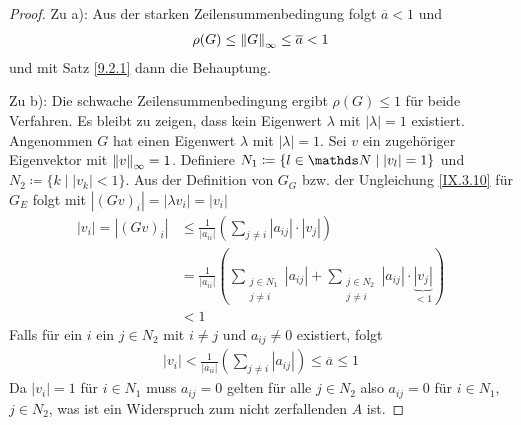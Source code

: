 \begin{Satze}[Zeilensummenkriterium]
\begin{proof}
    Zu a): Aus der starken Zeilensummenbedingung folgt $\overline{a}<1$
    und
    \begin{gather*}
      \rho(G)\leq \nn[G]_\infty \leq \overline{a}<1
    \end{gather*}
    und mit Satz \ref{9.2.1} dann die Behauptung.

    Zu b): Die schwache Zeilensummenbedingung ergibt 
    $\rho(G) \leq 1$ für beide Verfahren.
    Es bleibt zu zeigen, dass kein Eigenwert $\lambda$ mit
    $|\lambda|=1$ existiert.
    Angenommen $G$ hat einen Eigenwert $\lambda$ mit $|\lambda|=1$.
    Sei $v$ ein zugehöriger Eigenvektor mit $\nn[v]_\infty=1$.
    Definiere $N_1\coloneqq \{l\in\N \mid |v_l|=1\}$
    und $N_2\coloneqq \{k\mid |v_k| <1\}$.
    Aus der Definition von $G_G$ bzw. der Ungleichung \eqref{IX.3.10}
    für $G_E$ folgt mit $|(Gv)_i| = |\lambda v_i| = |v_i|$
    \begin{align*}
      |v_i| = |(Gv)_i| &\leq \frac{1}{|a_{ii}|}\left(
                         \sum_{j\neq i} |a_{ij}|\cdot |{v_j}|
                         \right) \\
                       &=\frac{1}{|a_{ii}|}\left(
                         \sum_{\substack{j\in N_1\\j\neq i}}|a_{ij}|
      +\sum_{\substack{j\in N_2\\j\neq i}} |a_{ij}|
      \cdot\underbrace{|{v_j}|}_{<1}
      \right) \\
                       &<1
    \end{align*}
    Falls für ein $i$ ein $j\in N_2$ mit $i\neq j$ und $a_{ij}\neq 0$
    existiert, folgt
    \begin{gather*}
      |v_i| < \frac{1}{|a_{ii}|} \left( \sum_{j\neq i}|a_{ij}|\right)
      \leq \overline{a} \leq 1
    \end{gather*}
    Da $|v_i|=1$ für $i\in N_1$ muss $a_{ij}=0$ gelten für alle $j\in N_2$
    also $a_{ij}=0$ für $i\in N_1$, $j\in N_2$,
    was ist ein Widerspruch zum nicht zerfallenden $A$ ist.
  \end{proof}
\end{Satze}




